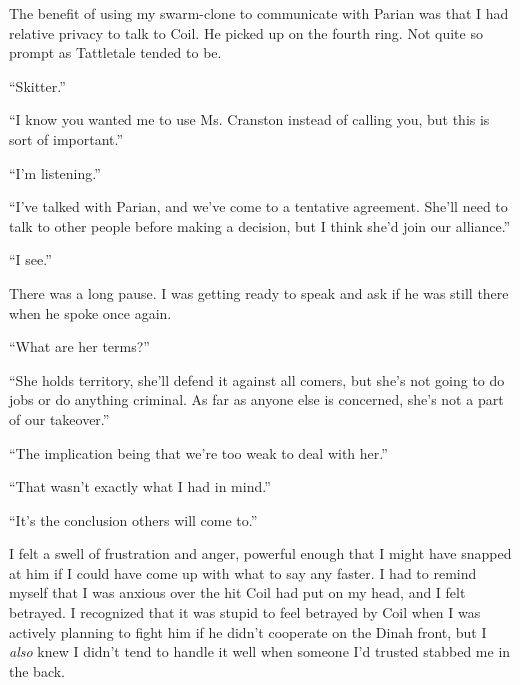 





The benefit of using my swarm-clone to communicate with Parian was that I had relative privacy to talk to Coil.  He picked up on the fourth ring.  Not quite so prompt as Tattletale tended to be.



``Skitter.''



``I know you wanted me to use Ms. Cranston instead of calling you, but this is sort of important.''



``I'm listening.''



``I've talked with Parian, and we've come to a tentative agreement.  She'll need to talk to other people before making a decision, but I think she'd join our alliance.''



``I see.''



There was a long pause.  I was getting ready to speak and ask if he was still there when he spoke once again.



``What are her terms?''



``She holds territory, she'll defend it against all comers, but she's not going to do jobs or do anything criminal.  As far as anyone else is concerned, she's not a part of our takeover.''



``The implication being that we're too weak to deal with her.''



``That wasn't exactly what I had in mind.''



``It's the conclusion others will come to.''



I felt a swell of frustration and anger, powerful enough that I might have snapped at him if I could have come up with what to say any faster.  I had to remind myself that I was anxious over the hit Coil had put on my head, and I felt betrayed.  I recognized that it was stupid to feel betrayed by Coil when I was actively planning to fight him if he didn't cooperate on the Dinah front, but I \emph{also} knew I didn't tend to handle it well when someone I'd trusted stabbed me in the back.



